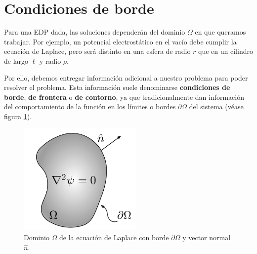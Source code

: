 


\section{Condiciones de borde}

Para una EDP dada, las soluciones dependerán del dominio $\Omega$ en que queramos trabajar. Por ejemplo, un potencial electrostático en el vacío debe cumplir la ecuación de Laplace, pero será distinto en una esfera de radio $r$ que en un cilindro de largo $\ell$ y radio $\rho$. 

Por ello, debemos entregar información adicional a nuestro problema para poder resolver el problema. Esta información suele denominarse \textbf{condiciones de borde}, \textbf{de frontera} o \textbf{de contorno}, ya que tradicionalmente dan información del comportamiento de la función en los límites o bordes $\partial \Omega$ del sistema (véase figura \ref{fig:condicionesdeborde}).

\begin{figure}[htb]
    \centering
    \includegraphics[width = 6cm]{Figuras/Condiciones-Borde.pdf}
    \caption{Dominio $\Omega$ de la ecuación de Laplace con borde $\partial \Omega$ y vector normal $\hat{n}$.}
    \label{fig:condicionesdeborde}
\end{figure}

